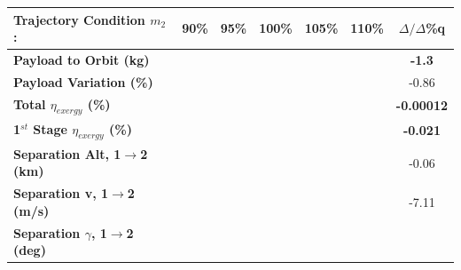 \begin{table}[ht]
	\centering
	
	\begin{tabular}{l c c c c c c} %
	\hline \textbf{Trajectory Condition  \qquad  $m_{2}$: }
	&90\%
	&95\%
	&100\%
	& 105\%
	& 110\%
	& $\Delta/\Delta$\%q
		\\
		\hline \textbf{Payload to Orbit (kg)}
		& \textbf{\PayloadToOrbitmSPARTANNinetyNoReturn}
		& \textbf{\PayloadToOrbitmSPARTANNinetyFiveNoReturn}
		& \textbf{\PayloadToOrbitmSPARTANStandardNoReturn}
		& \textbf{\PayloadToOrbitmSPARTANOneHundredFiveNoReturn}
		& \textbf{\PayloadToOrbitmSPARTANOneHundredTenNoReturn}
		&\textbf{-1.3}
		\\
		\textbf{Payload Variation (\%)}
		& \PayloadVarmSPARTANNinetyNoReturn
		& \PayloadVarmSPARTANNinetyFiveNoReturn
		& \PayloadVarmSPARTANStandardNoReturn
		& \PayloadVarmSPARTANOneHundredFiveNoReturn
		& \PayloadVarmSPARTANOneHundredTenNoReturn
		&-0.86
		\\
		\textbf{Total $\eta_{exergy}$ (\%)}
		& \textbf{\totalExergyEffmSPARTANNinetyNoReturn}
		& \textbf{\totalExergyEffmSPARTANNinetyFiveNoReturn}
		& \textbf{\totalExergyEffmSPARTANStandardNoReturn}
		& \textbf{\totalExergyEffmSPARTANOneHundredFiveNoReturn}
		& \textbf{\totalExergyEffmSPARTANOneHundredTenNoReturn}
		& \textbf{-0.00012}
		\\
		\hline 
		\textbf{1$^{st}$ Stage $\eta_{exergy}$ (\%)}
		& \textbf{\firstExergyEffmSPARTANNinetyNoReturn}
		& \textbf{\firstExergyEffmSPARTANNinetyFiveNoReturn}
		& \textbf{\firstExergyEffmSPARTANStandardNoReturn}
		& \textbf{\firstExergyEffmSPARTANOneHundredFiveNoReturn}
		& \textbf{\firstExergyEffmSPARTANOneHundredTenNoReturn}
		& \textbf{-0.021}
		\\
		\textbf{Separation Alt, 1$\rightarrow$2 (km)}
		& \firstsecondSeparationAltmSPARTANNinetyNoReturn
		& \firstsecondSeparationAltmSPARTANNinetyFiveNoReturn
		& \firstsecondSeparationAltmSPARTANStandardNoReturn
		& \firstsecondSeparationAltmSPARTANOneHundredFiveNoReturn
		& \firstsecondSeparationAltmSPARTANOneHundredTenNoReturn
		&-0.06
		\\
		\textbf{Separation v, 1$\rightarrow$2 (m/s)}
		& \firstsecondSeparationvmSPARTANNinetyNoReturn
		& \firstsecondSeparationvmSPARTANNinetyFiveNoReturn
		& \firstsecondSeparationvmSPARTANStandardNoReturn
		& \firstsecondSeparationvmSPARTANOneHundredFiveNoReturn
		& \firstsecondSeparationvmSPARTANOneHundredTenNoReturn
		&-7.11
		\\
		\textbf{Separation $\gamma$, 1$\rightarrow$2 (deg)}

\end{tabular}
\end{table}
